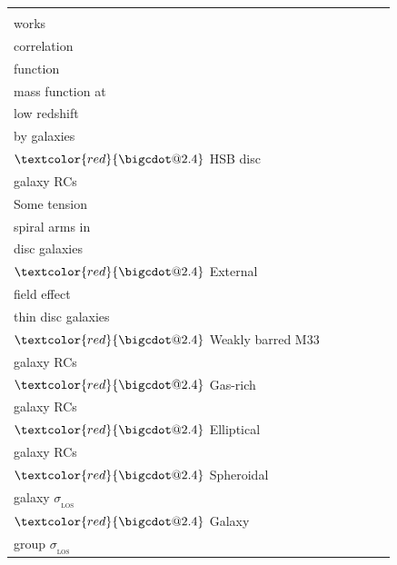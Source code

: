 \documentclass[fleqn,usenatbib,useAMS]{mnras} %
\makeatletter
\DeclareRobustCommand*\bigcdot{\mathpalette\bigcdot@{2.4}}
\DeclareRobustCommand*\bigcdot@[2]{\mathbin{\vcenter{\hbox{\scalebox{#2}{$\m@th#1\bullet$}}}}}
\makeatother
\begin{document}
\begin{table}
\begin{tabular}{llllll}
		\makecell{Plausibly \\ works} & \makecell{$\textcolor{red}{\bigcdot}$ Weak lensing \\ correlation \\ function} & \makecell{} & \makecell{$\textcolor{red}{\bigcdot}$ Galaxy cluster \\ mass function at \\ low redshift} & \makecell{} & \makecell{$\textcolor{red}{\bigcdot}$ Weak lensing \\ by galaxies \\ $\textcolor{red}{\bigcdot}$ HSB disc \\ galaxy RCs} \\ \hline
		Some tension & \makecell{$\textcolor{red}{\bigcdot}$ Number of \\ spiral arms in \\ disc galaxies \\ $\textcolor{red}{\bigcdot}$ External \\ field effect} & \makecell{} & \makecell{} & \makecell{$\textcolor{red}{\bigcdot}$ Prevalence of \\ thin disc galaxies \\ $\textcolor{red}{\bigcdot}$ Weakly barred M33} & \makecell{$\textcolor{red}{\bigcdot}$ LSB disc \\ galaxy RCs \\ $\textcolor{red}{\bigcdot}$ Gas-rich \\ galaxy RCs \\ $\textcolor{red}{\bigcdot}$  Elliptical \\ galaxy RCs \\ $\textcolor{red}{\bigcdot}$ Spheroidal \\ galaxy $\sigma_{_\text{LOS}}$ \\ $\textcolor{red}{\bigcdot}$ Galaxy \\ group $\sigma_{_\text{LOS}}$} \\ \hline

\end{tabular}
\end{table}
\end{document}
